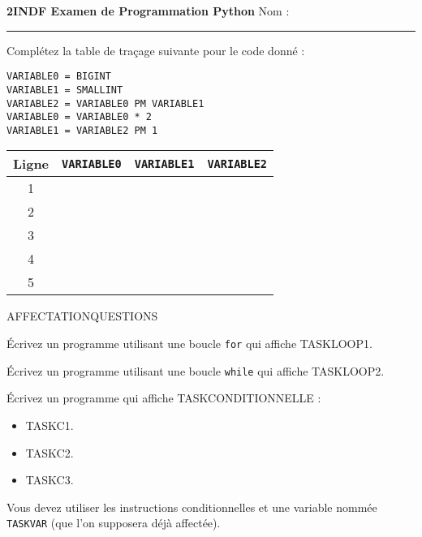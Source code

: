 \documentclass[12pt]{exam}
\begin{document}
\begin{center}
\textbf{2INDF Examen de Programmation Python} \hfill Nom : \rule{6cm}{0.4pt}
\end{center}

\begin{questions}

\question[4] Complétez la table de traçage suivante pour le code donné :

\hfill
\begin{minipage}[t]{0.2\textwidth}
\vspace{0mm}
\begin{lstlisting}
VARIABLE0 = BIGINT
VARIABLE1 = SMALLINT
VARIABLE2 = VARIABLE0 PM VARIABLE1
VARIABLE0 = VARIABLE0 * 2
VARIABLE1 = VARIABLE2 PM 1
\end{lstlisting}
\end{minipage}
\hfill
\begin{minipage}[t]{0.4\textwidth}
\vspace{-4mm}
    \begin{tabular}{|c|p{5mm}|p{5mm}|p{5mm}|}
        \hline
        {\footnotesize Ligne} & \texttt{VARIABLE0} & \texttt{VARIABLE1} & \texttt{VARIABLE2} \\
        \hline
        1 &  &  &  \\
        \hline
        2 &  &  &  \\
        \hline
        3 &  &  &  \\
        \hline
        4 &  &  &  \\
        \hline
        5 &  &  &  \\
        \hline
    \end{tabular}
\end{minipage}

AFFECTATIONQUESTIONS

\question[4] Écrivez un programme utilisant une boucle \texttt{for} qui affiche TASKLOOP1.
\fillwithgrid{24mm}

\question[4] Écrivez un programme utilisant une boucle \texttt{while} qui affiche TASKLOOP2.
\fillwithgrid{32mm}

\newpage
\question[5] Écrivez un programme qui affiche TASKCONDITIONNELLE :
\begin{itemize}
    \item TASKC1.
    \item TASKC2.
    \item TASKC3.
\end{itemize}
Vous devez utiliser les instructions conditionnelles et une variable nommée \texttt{TASKVAR} (que l'on supposera déjà affectée).
\smallskip\fillwithgrid{45mm}


\end{questions}
\end{document}
